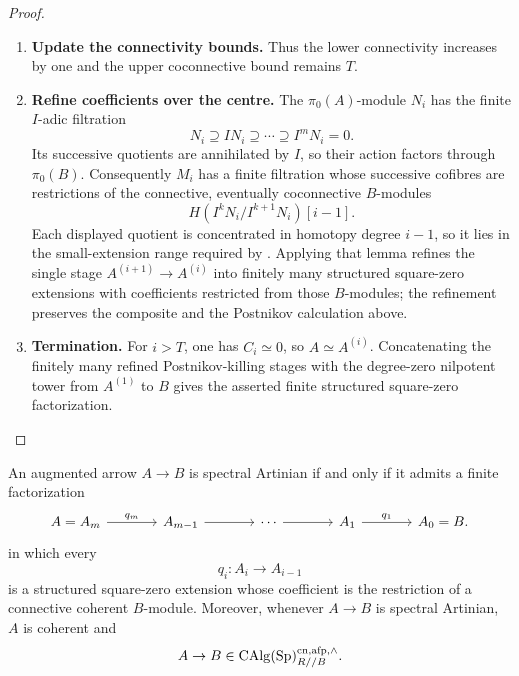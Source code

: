 \begin{proof}
\begin{enumerate}[label=\textup{(\arabic*)}]
    Therefore
    \[
        C_{i+1}
        \simeq
        \operatorname{fib}
        \bigl(C_i\to H\pi_i(C_i)[i]\bigr)
        \simeq
        \tau_{\geq i+1}C_i.
    \]
    \item \textbf{Update the connectivity bounds.}
    Thus the lower connectivity increases by one and the upper coconnective bound
    remains \(T\).
    \item \textbf{Refine coefficients over the centre.}
    The \(\pi_0(A)\)-module \(N_i\) has the finite \(I\)-adic filtration
    \[
        N_i\supseteq IN_i\supseteq\cdots\supseteq I^mN_i=0.
    \]
    Its successive quotients are annihilated by \(I\), so their action factors
    through \(\pi_0(B)\). Consequently \(M_i\) has a finite filtration whose
    successive cofibres are restrictions of the connective, eventually
    coconnective \(B\)-modules
    \[
        H(I^kN_i/I^{k+1}N_i)[i-1].
    \]
    Each displayed quotient is concentrated in homotopy degree \(i-1\), so it
    lies in the small-extension range required by
    . Applying that lemma
    refines the single stage \(A^{(i+1)}\to A^{(i)}\) into finitely many
    structured square-zero extensions with coefficients restricted from those
    \(B\)-modules; the refinement preserves the composite and the Postnikov
    calculation above.
    \item \textbf{Termination.}
    For \(i>T\), one has \(C_i\simeq0\), so \(A\simeq A^{(i)}\). Concatenating
    the finitely many refined Postnikov-killing stages with the degree-zero
    nilpotent tower from \(A^{(1)}\) to \(B\) gives the asserted finite
    structured square-zero factorization.
\end{enumerate}
\end{proof}

\begin{proposition}
\label{prop:artinian-finite-square-zero-generation}
An augmented arrow \(A\to B\) is spectral Artinian if and only if it admits a finite factorization
\[
\begin{tikzcd}[column sep=large]
    A=A_m
        \arrow[r,"q_m"]
        &
    A_{m-1}
        \arrow[r]
        &
    \cdots
        \arrow[r]
        &
    A_1
        \arrow[r,"q_1"]
        &
    A_0=B .
\end{tikzcd}
\]
in which every
\[
    q_i:A_i\longrightarrow A_{i-1}
\]
is a structured square-zero extension whose coefficient is the restriction of
a connective coherent \(B\)-module.
Moreover, whenever \(A\to B\) is spectral Artinian, \(A\) is coherent and
\[
    A\to B
    \in
    \operatorname{CAlg}(\operatorname{Sp})^{\mathrm{cn},\mathrm{afp},\wedge}_{R//B}.
\]
\end{proposition}

